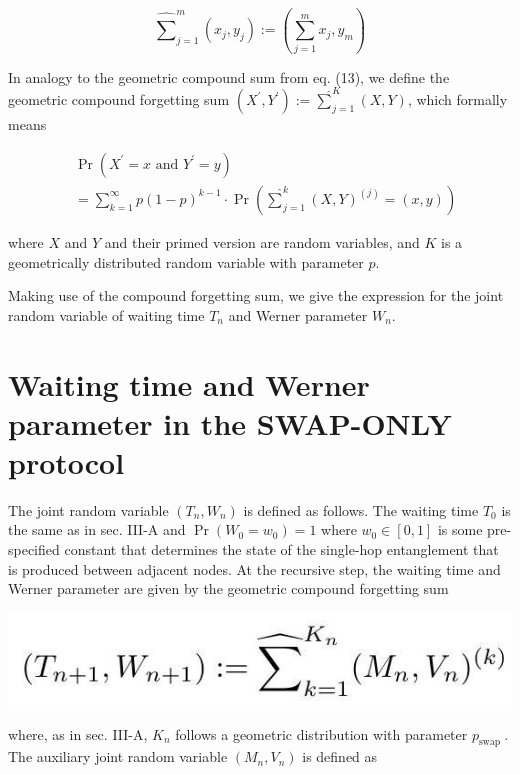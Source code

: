 \documentclass[10pt]{article}
\begin{document}
\begin{equation*}
\widehat{\sum}_{j=1}^{m}\left(x_{j}, y_{j}\right):=\left(\sum_{j=1}^{m} x_{j}, y_{m}\right) \tag{14}
\end{equation*}


In analogy to the geometric compound sum from eq. (13), we define the geometric compound forgetting sum $\left(X^{\prime}, Y^{\prime}\right):=\widehat{\sum}_{j=1}^{K}(X, Y)$, which formally means

$$
\begin{aligned}
& \operatorname{Pr}\left(X^{\prime}=x \text { and } Y^{\prime}=y\right) \\
& =\sum_{k=1}^{\infty} p(1-p)^{k-1} \cdot \operatorname{Pr}\left(\widehat{\sum}_{j=1}^{k}(X, Y)^{(j)}=(x, y)\right)
\end{aligned}
$$

where $X$ and $Y$ and their primed version are random variables, and $K$ is a geometrically distributed random variable with parameter $p$.

Making use of the compound forgetting sum, we give the expression for the joint random variable of waiting time $T_{n}$ and Werner parameter $W_{n}$.

\section*{Waiting time and Werner parameter in the SWAP-ONLY protocol}
The joint random variable $\left(T_{n}, W_{n}\right)$ is defined as follows. The waiting time $T_{0}$ is the same as in sec. III-A and $\operatorname{Pr}\left(W_{0}=w_{0}\right)=1$ where $w_{0} \in[0,1]$ is some pre-specified constant that determines the state of the single-hop entanglement that is produced between adjacent nodes. At the recursive step, the waiting time and Werner parameter are given by the geometric compound forgetting sum

\begin{center}
\includegraphics[max width=\textwidth]{2024_06_11_851f269fc4a3fe65b610g-2}
\end{center}

where, as in sec. III-A, $K_{n}$ follows a geometric distribution with parameter $p_{\text {swap }}$. The auxiliary joint random variable $\left(M_{n}, V_{n}\right)$ is defined as
\end{document}

